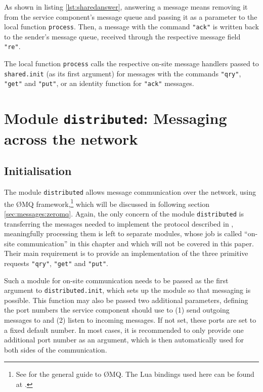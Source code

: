 As shown in listing \ref{lst:sharedanswer}, answering a message means removing it from the service component's message queue and passing it as a parameter to the local function \texttt{process}. Then, a message with the command \texttt{"ack"} is written back to the sender's message queue, received through the respective message field \texttt{"re"}.

The local function \texttt{process} calls the respective on-site message handlers passed to \texttt{shared.init} (as its first argument) for messages with the commands \texttt{"qry"}, \texttt{"get"} and \texttt{"put"}, or an identity function for \texttt{"ack"} messages.


\section{Module \texttt{distributed}: Messaging across the network}
\label{sec:messaging:distributed}

\subsection{Initialisation}

The module \texttt{distributed} allows message communication over the network, using the \O MQ framework,\footnote{See \cite{ZeroMQ} for the general guide to \O MQ. The Lua bindings used here can be found at \cite{ZeroMQBindings}.} which will be discussed in following section \ref{sec:messages:zeromq}. Again, the only concern of the module \texttt{distributed} is transferring the messages needed to implement the protocol described in \cite{AscensD11}, meaningfully processing them is left to separate modules, whose job is called ``on-site communication'' in this chapter and which will not be covered in this paper. Their main requirement is to provide an implementation of the three primitive requests \texttt{"qry"}, \texttt{"get"} and \texttt{"put"}. 

Such a module for on-site communication needs to be passed as the first argument to \texttt{distributed.init}, which sets up the module so that messaging is possible. This function may also be passed two additional parameters, defining the port numbers the service component should use to (1) send outgoing messages to and (2) listen to incoming messages. If not set, these ports are set to a fixed default number. In most cases, it is recommended to only provide one additional port number as an argument, which is then automatically used for both sides of the communication.

